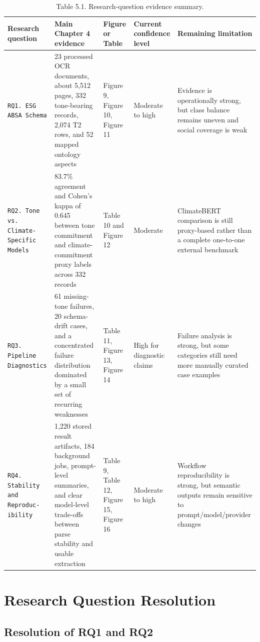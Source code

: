 \begin{table}[htbp]
\centering
\caption{Table 5.1. Research-question evidence summary.}
\label{tab:research-question-evidence-summary}
\footnotesize
\setlength{\tabcolsep}{4pt}
\renewcommand{\arraystretch}{1.15}
\begin{tabularx}{\linewidth}{|p{2cm}|X|p{2cm}|p{2cm}|X|}
\hline
\textbf{Research question} & \textbf{Main Chapter 4 evidence} & \textbf{Figure or Table} & \textbf{Current confidence level} & \textbf{Remaining limitation} \\ \hline
\texttt{RQ1. ESG ABSA Schema} & 23 processed OCR documents, about 5,512 pages, 332 tone-bearing records, 2,074 T2 rows, and 52 mapped ontology aspects & Figure 9, Figure 10, Figure 11 & Moderate to high & Evidence is operationally strong, but class balance remains uneven and social coverage is weak \\ \hline
\texttt{RQ2. Tone vs. Climate-
Specific Models} & 83.7\% agreement and Cohen's kappa of 0.645 between tone commitment and climate-commitment proxy labels across 332 records & Table 10 and Figure 12 & Moderate & ClimateBERT comparison is still proxy-based rather than a complete one-to-one external benchmark \\ \hline
\texttt{RQ3. Pipeline Diagnostics} & 61 missing-tone failures, 20 schema-drift cases, and a concentrated failure distribution dominated by a small set of recurring weaknesses & Table 11, Figure 13, Figure 14 & High for diagnostic claims & Failure analysis is strong, but some categories still need more manually curated case examples \\ \hline
\texttt{RQ4. Stability and Reproduc-
ibility} & 1,220 stored result artifacts, 184 background jobs, prompt-level summaries, and clear model-level trade-offs between parse stability and usable extraction & Table 9, Table 12, Figure 15, Figure 16 & Moderate to high & Workflow reproducibility is strong, but semantic outputs remain sensitive to prompt/model/provider changes \\ \hline
\end{tabularx}
\end{table}

\section{Research Question Resolution}

\subsection{Resolution of RQ1 and RQ2}

